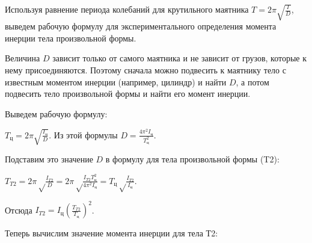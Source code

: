 
Используя равнение периода колебаний для крутильного маятника $T = 2 \pi \sqrt{\frac{I}{D} }$,
выведем рабочую формулу для экспериментального определения момента инерции тела произвольной формы.

Величина $D$ зависит только от самого маятника и не зависит от грузов, которые к нему присоединяются. Поэтому сначала можно подвесить к маятнику тело с известным моментом инерции (например, цилиндр) и найти $D$, а потом подвесить тело произвольной формы и найти его момент инерции.

Выведем рабочую формулу:

$T_\text{ц} = 2 \pi \sqrt {\frac{I_\text{ц}}{D}}$. Из этой формулы $D = \frac{4 \pi^2 I_\text{ц}}{T_\text{ц}^2}$.

Подставим это значение $D$ в формулу для тела произвольной формы (T2):

$T_{T2} = 2 \pi \sqrt \frac{I_{T2}}{D} = 2 \pi \sqrt \frac{I_{T2} T_\text{ц}^2}{4 \pi^2 I_\text{ц}} = T_\text{ц} \sqrt \frac{I_{T2}}{I_\text{ц}}$.

Отсюда $I_{T2} = I_\text{ц} (\frac{T_{T2}}{T_\text{ц}})^2$.

Теперь вычислим значение момента инерции для тела Т2:

